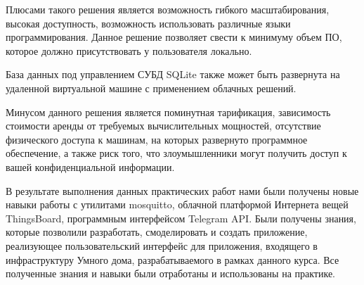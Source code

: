 \documentclass[a4paper,14pt]{extarticle}
\begin{document}
Плюсами такого решения является возможность гибкого масштабирования, высокая доступность, возможность использовать различные языки программирования. Данное решение позволяет свести к минимуму объем ПО, которое должно присутствовать у пользователя локально.

База данных под управлением СУБД SQLite также может быть развернута на удаленной виртуальной машине с применением облачных решений. 

Минусом данного решения является поминутная тарификация, зависимость стоимости аренды от требуемых вычислительных мощностей, отсутствие физического доступа к машинам, на которых развернуто программное обеспечение, а также риск того, что злоумышленники могут получить доступ к вашей конфиденциальной информации.  

\newpage
{}

В результате выполнения данных практических работ нами были получены новые навыки работы с утилитами mosquitto, облачной платформой Интернета вещей ThingsBoard, программным интерфейсом Telegram API. Были получены знания, которые позволили разработать, смоделировать и создать приложение, реализующее пользовательский интерфейс для приложения, входящего в инфраструктуру Умного дома, разрабатываемого в рамках данного курса.
Все полученные знания и навыки были отработаны и использованы на практике.
\end{document}
